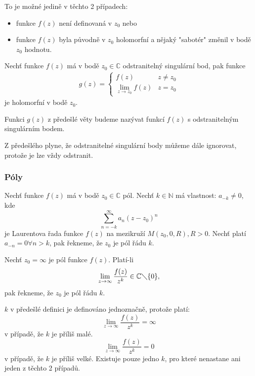 To je možné jedině v těchto 2 případech:
\begin{itemize}
\item funkce $f(z)$ není definovaná v $z_0$ nebo
\item funkce $f(z)$ byla původně v $z_0$ holomorfní a nějaký "sabotér" změnil v bodě $z_0$ hodnotu.
\end{itemize}

\begin{theorem}
Nechť funkce $f(z)$ má v bodě $z_0\in\mathbb{C}$ odstranitelný singulární bod, pak funkce
\begin{align*}
g(z) = 
\begin{cases}
	f(z) & z \neq z_0 \\
    \lim_{z\rightarrow z_0}f(z) & z=z_0
\end{cases}
\end{align*}
je holomorfní v bodě $z_0$.
\end{theorem}

\begin{definition}
Funkci $g(z)$ z předešlé věty budeme nazývat funkcí $f(z)$ s odstranitelným singulárním bodem.
\end{definition}

Z předešlého plyne, že odstranitelné singulární body můžeme dále ignorovat, protože je lze vždy odstranit.

\subsubsection{Póly}
\begin{definition}
Nechť funkce $f(z)$ má v bodě $z_0\in\mathbb{C}$ pól. Nechť $k\in\mathbb{N}$ má vlastnost: $a_{-k}\neq 0$, kde $$\sum_{n=-k}^{\infty}a_n(z-z_0)^n$$ je Laurentova řada funkce $f(z)$ na mezikruží $M(z_0,0,R), R>0$. Nechť platí $a_{-n}=0 \forall n > k$, pak řekneme, že $z_0$ je pól řádu $k$.
\end{definition}

\begin{definition}
Nechť $z_0=\infty$ je pól funkce $f(z)$. Platí-li $$\lim_{z\rightarrow\infty}\frac{f(z)}{z^k}\in\mathbb{C}\diagdown\{0\},$$ pak řekneme, že $z_0$ je pól řádu $k$.
\end{definition}

$k$ v předešlé definici je definováno jednoznačně, protože platí: $$\lim_{z\rightarrow \infty}\frac{f(z)}{z^k}=\infty$$ v případě, že $k$ je příliš malé. $$\lim_{z\rightarrow \infty}\frac{f(z)}{z^k}=0$$ v případě, že $k$ je příliš velké. Existuje pouze jedno $k$, pro které nenastane ani jeden z těchto 2 případů.

